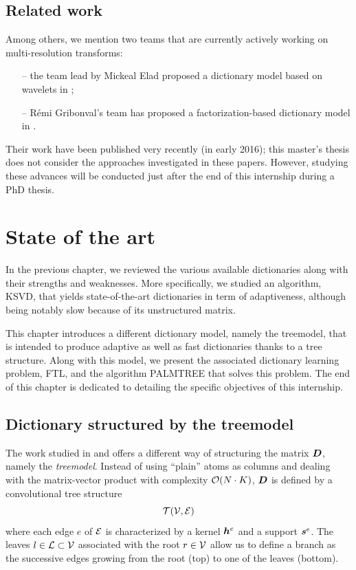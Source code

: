 \section{Related work}
Among others, we mention two teams that are currently actively working on multi-resolution transforms:
\begin{itemize}
	\item[--] the team lead by Mickeal Elad proposed a dictionary model based on wavelets in \cite{sulam_trainlets:_2016};
	\item[--] Rémi Gribonval’s team has proposed a factorization-based dictionary model in  \cite{le_magoarou_flexible_2016}.
\end{itemize}
Their work have been published very recently (in early 2016); this master's thesis does not consider the approaches investigated in these papers. However, studying these advances will be conducted just after the end of this internship during a PhD thesis.





\chapter{State of the art}

In the previous chapter, we reviewed the various available dictionaries along with their strengths and weaknesses. More specifically, we studied an algorithm, \ac{KSVD}, that yields state-of-the-art dictionaries in term of adaptiveness, although being notably slow because of its unstructured matrix.

\noindent
This chapter introduces a different dictionary model, namely the \gls{treemodel}, that is intended to produce adaptive as well as fast dictionaries thanks to a tree structure. Along with this model, we present the associated dictionary learning problem, \acs{FTL}, and the algorithm \ac{PALMTREE} that solves this problem. The end of this chapter is dedicated to detailing the specific objectives of this internship.

\section{Dictionary structured by the \gls{treemodel}}\label{sec_tree_model}
The work studied in \cite{chabiron_toward_2015} and \cite{chabiron_optimization_2016} offers a different way of structuring the matrix $\bm{D}$, namely the \emph{\gls{treemodel}}. Instead of using “plain” atoms as columns and dealing with the matrix-vector product with complexity $\mathcal{O}(N \cdot K)$, $\bm{D}$ is defined by a convolutional tree structure \begin{equation*}\mathcal T(\mathcal V,\mathcal E)\end{equation*} where each edge $e$ of $\mathcal E$ is characterized by a kernel $\bm{h}^e$ and a support $\bm{s}^e$. The leaves $l \in \mathcal L \subset \mathcal V$ associated with the root $r \in \mathcal V$ allow us to define a branch as the successive edges growing from the root (top) to one of the leaves (bottom).

